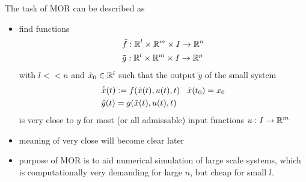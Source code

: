 The task of MOR can be described as 
\begin{itemize}
	\item find functions 
	\begin{align*}
		& \tilde{f} : \mathbb{R}^l \times \mathbb{R}^m \times I  \rightarrow  \mathbb{R}^n \\
		& \tilde{g}: \mathbb{R}^l \times \mathbb{R}^m \times I \rightarrow \mathbb{R}^p
	\end{align*}
	with $l <<n$ and $\tilde{x}_0 \in \mathbb{R}^l$ such that the output $\tilde{y}$ of the small  system 
	\begin{align*}
		& \dot{\tilde{x}}(t) : = f(\tilde{x}(t), u(t), t) \hspace{2ex} \tilde{x}(t_0)=x_0 \\
		& \tilde{y}(t)=g(\tilde{x}(t),u(t),t) 
	\end{align*}
	is very close to $y$ for most (or all admissable) input functions $u:I \rightarrow \mathbb{R}^m$
	\item meaning of very close will become clear later
	\item purpose of MOR is to aid numerical simulation of large scale systems, which is computationally very demanding for large $n$, but cheap for small $l$. 
\end{itemize}

